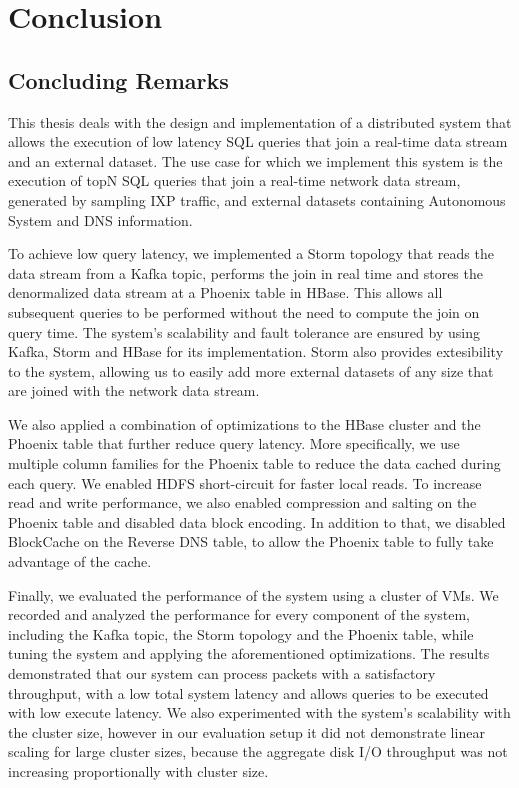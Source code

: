 \chapter{Conclusion}\label{chapter:conclusion}

\section{Concluding Remarks}

This thesis deals with the design and implementation of a distributed system that allows the execution of low latency SQL queries that join a real-time data stream and an external dataset. The use case for which we implement this system is the execution of topN SQL queries that join a real-time network data stream, generated by sampling IXP traffic, and external datasets containing Autonomous System and DNS information. 

To achieve low query latency, we implemented a Storm topology that reads the data stream from a Kafka topic, performs the join in real time and stores the denormalized data stream at a Phoenix table in HBase. This allows all subsequent queries to be performed without the need to compute the join on query time. The system's scalability and fault tolerance are ensured by using Kafka, Storm and HBase for its implementation. Storm also provides extesibility to the system, allowing us to easily add more external datasets of any size that are joined with the network data stream.

We also applied a combination of optimizations to the HBase cluster and the Phoenix table that further reduce query latency. More specifically, we use multiple column families for the Phoenix table to reduce the data cached during each query. We enabled HDFS short-circuit for faster local reads. To increase read and write performance, we also enabled compression and salting on the Phoenix table and disabled data block encoding. In addition to that, we disabled BlockCache on the Reverse DNS table, to allow the Phoenix table to fully take advantage of the cache.

Finally, we evaluated the performance of the system using a cluster of VMs. We recorded and analyzed the performance for every component of the system, including the Kafka topic, the Storm topology and the Phoenix table, while tuning the system and applying the aforementioned optimizations. The results demonstrated that our system can process packets with a satisfactory throughput, with a low total system latency and allows queries to be executed with low execute latency. We also experimented with the system's scalability with the cluster size, however in our evaluation setup it did not demonstrate linear scaling for large cluster sizes, because the aggregate disk I/O throughput was not increasing proportionally with cluster size.


